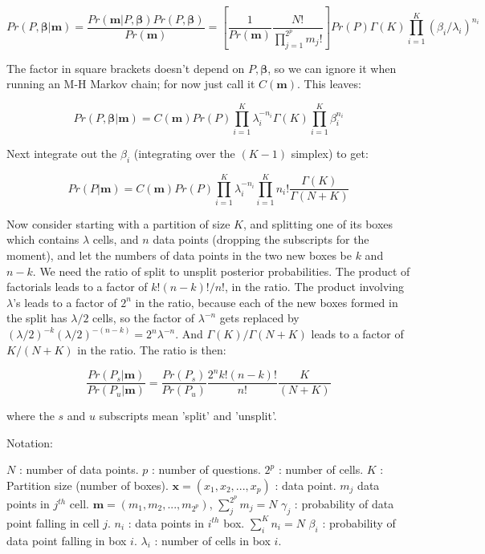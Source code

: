 \documentclass[14pt,english]{extarticle}
\def\Rho{P}
\begin{document}
$$  Pr(P, \boldsymbol{\beta}|\boldsymbol{m})
= \frac{Pr(\boldsymbol{m}|\Rho, \boldsymbol{\beta}) Pr(P, \boldsymbol{\beta}) }{ Pr(\boldsymbol{m}) }
= [\frac{1}{Pr(\boldsymbol{m})} \frac{N!}{\prod_{j=1}^{2^p}m_j!}] Pr(P)  \Gamma(K) \prod_{i=1}^{K} ({\beta_{i}}/{\lambda_i})^{n_i} $$

The factor in square brackets doesn't depend on $P,\boldsymbol{\beta}$, so we can ignore it when running an M-H Markov chain; for now just call it $C(\boldsymbol{m})$. This leaves:

$$ Pr(P, \boldsymbol{\beta}|\boldsymbol{m}) = C(\boldsymbol{m})  Pr(P) \prod_{i=1}^{K} \lambda_i^{-n_i} \Gamma(K) \prod_{i=1}^{K} \beta_{i}^{n_i} $$

Next integrate out the $\beta_i$ (integrating over the $(K-1)$ simplex) to get:

$$ Pr(P|\boldsymbol{m}) = C(\boldsymbol{m})  Pr(P)  \prod_{i=1}^{K} \lambda_i^{-n_i}  \prod_{i=1}^{K} n_i! \frac{\Gamma(K)}{\Gamma (N + K) } $$

Now consider starting with a partition of size $K$, and splitting one of its boxes which contains $\lambda$ cells, and $n$ data points (dropping the subscripts for the moment), and let the numbers of data points in the two new boxes be $k$ and $n-k$. We need the ratio of split to unsplit posterior probabilities. The product of factorials leads to a factor of $k!(n-k)!/n!$, in the ratio. The product involving $\lambda$'s leads to a factor of $2^n$ in the ratio, because each of the new boxes formed in the split has $\lambda/2$ cells, so the factor of $\lambda^{-n}$ gets replaced by $(\lambda/2)^{-k} (\lambda/2)^{-(n-k)} = 2^n \lambda^{-n} $. And $\Gamma(K)/\Gamma(N+K)$ leads to a factor of $K/(N+K)$ in the ratio. The ratio is then:

$$ \frac{ Pr(P_s|\boldsymbol{m}) }{ Pr(P_u|\boldsymbol{m}) } =
\frac{ Pr(P_s)}{ Pr(P_u) } \frac{2^{n} k!(n-k)!}{n!} \frac{K}{(N+K)} $$

where the $s$ and $u$ subscripts mean 'split' and 'unsplit'. 

\vspace {10 mm}
Notation:

$N$ : number of data points. \newline
$p$ : number of questions. $2^p$ : number of cells. \newline
$K$ : Partition size (number of boxes). \newline
$\boldsymbol{x} = (x_1,x_2, ... , x_p) $ : data point.  \newline
$m_j$ data points in $j^{th}$ cell.  $\boldsymbol{m} = (m_1,m_2, ... , m_{2^p})$, $\sum_{j}^{2^p}m_j = N$ \newline
$\gamma_j$ : probability of data point falling in cell $j$. \newline
$n_i$ : data points in $i^{th}$ box. $\sum_{i}^{K}n_i = N$ \newline
$\beta_i$ : probability of data point falling in box $i$. \newline
$\lambda_i$ : number of cells in box $i$. \newline



 
\end{document}
